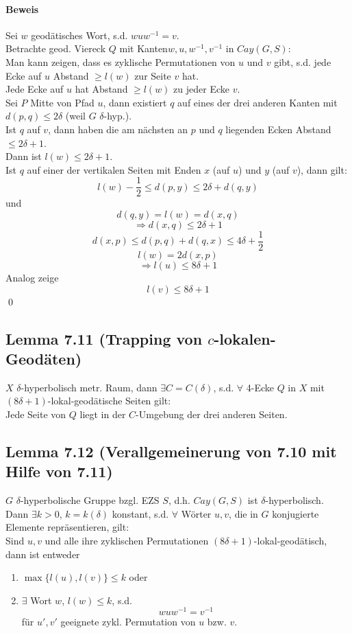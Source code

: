 \documentclass{article}
\begin{document}
\paragraph{Beweis}
Sei $w$ geodätisches Wort, s.d. $wuw^{-1} = v$.\\
Betrachte geod. Viereck $Q $ mit Kanten$ w,u, w^{-1},v^{-1}$ in $Cay(G,S)$:\\
Man kann zeigen, dass es zyklische Permutationen von $u$ und $v$ gibt, s.d. jede Ecke auf $u$ Abstand $\geq l(w)$ zur Seite $v$ hat.\\
Jede Ecke auf $u$ hat Abstand $\geq l(w)$ zu jeder Ecke $v$.\\
Sei $P$ Mitte von Pfad $u$, dann existiert $q$ auf eines der drei anderen Kanten mit $d(p,q) \leq 2\delta$ (weil $G$ $\delta$-hyp.).\\
Ist $q$ auf $v$, dann haben die am nächsten an $p$ und $q$ liegenden Ecken Abstand $\leq 2\delta + 1$.\\
Dann ist $l(w) \leq 2\delta + 1$.\\
Ist $q$ auf einer der vertikalen Seiten mit Enden $x$ (auf $u$) und $y$ (auf $v$), dann gilt:
\[ l(w) - \frac{1}{2} \leq d(p,y) \leq 2\delta + d(q,y)  \]
und
\[ d(q,y) = l(w) = d(x,q) \]
\[\Longrightarrow d(x,q)  \leq 2\delta + 1 \]
\[ d(x,p)  \leq d(p,q) + d(q,x) \leq 4\delta + \frac{1}{2} \]
\[l(w) = 2d(x,p) \]
\[ \Longrightarrow l(u) \leq 8\delta + 1 \]
Analog zeige
\[l(v) \leq 8\delta + 1 \]
\qed


\subsection{Lemma 7.11 (Trapping von $c$-lokalen-Geodäten)}
$X$ $\delta$-hyperbolisch metr. Raum, dann $\exists C = C(\delta)$, s.d. $\forall$ 4-Ecke $Q$ in $X$ mit $(8\delta + 1)$-lokal-geodätische Seiten gilt:\\
Jede Seite von $Q$ liegt in der $C$-Umgebung der drei anderen Seiten.

\subsection{Lemma 7.12 (Verallgemeinerung von 7.10 mit Hilfe von 7.11)}
$G$ $\delta$-hyperbolische Gruppe bzgl. EZS $S$, d.h. $Cay(G,S)$ ist $\delta$-hyperbolisch.\\
Dann $\exists k > 0$, $k = k(\delta)$ konstant, s.d. $\forall$ Wörter $u,v$, die in $G$ konjugierte Elemente repräsentieren, gilt:\\
Sind $u,v$ und alle ihre zyklischen Permutationen $(8\delta + 1)$-lokal-geodätisch, dann ist entweder
\begin{enumerate}
	\item $\max\{ l(u),l(v) \} \leq k$ oder
	\item $\exists $ Wort $w$, $l(w) \leq k$, s.d.
	\[wuw^{-1} =v^{-1} \]
	für $u',v'$ geeignete zykl. Permutation von $u$ bzw. $v$.
\end{enumerate}
\end{document}
